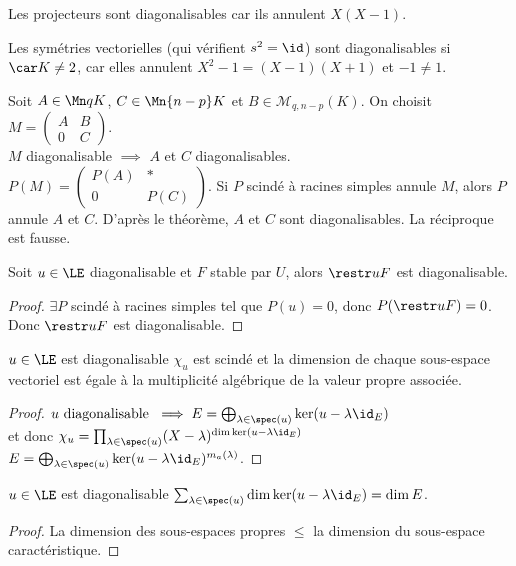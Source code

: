 \begin{exemple}
	Les projecteurs sont diagonalisables car ils annulent $X(X-1)$.

	Les symétries vectorielles (qui vérifient $s^2 = \id$) sont diagonalisables
	si $\car K \neq 2$, car elles annulent $X^2 - 1 = (X-1)(X+1)$ et $-1 \neq 1$.
\end{exemple}


\begin{exemple}
	Soit $A \in \Mn q K$, $C \in \Mn {n-p} K$ et $B \in \mathcal{M}_{q, n-p}(K)$.
	On choisit $M = \begin{pmatrix} A & B \\ 0 & C \end{pmatrix}$.\\
	$M$ diagonalisable $\implies$ $A$ et $C$ diagonalisables.\\
	$P(M) = \begin{pmatrix} P(A) & * \\ 0 & P(C) \end{pmatrix}$. Si $P$ scindé à racines simples annule $M$, alors $P$ annule $A$ et $C$.
	D'après le théorème, $A$ et $C$ sont diagonalisables.
	La réciproque est fausse.
\end{exemple}


\begin{prop}
	Soit $u \in \LE$ diagonalisable et $F$ stable par $U$, alors $\restr u F $ est diagonalisable.
\end{prop}

\begin{proof}
	$\exists P$ scindé à racines simples tel que $P(u) = 0$, donc $P(\restr u F) = 0$. Donc $\restr u F$ est diagonalisable.
\end{proof}


\begin{theorem}
	$u \in \LE$ est diagonalisable \ssi $\chi_u$ est scindé et la dimension de chaque sous-espace vectoriel est égale à la multiplicité
	algébrique de la valeur propre associée.
\end{theorem}

\begin{proof}
	$u \text{ diagonalisable } \implies E = \bigoplus_{\lambda \in \spec(u)} \ker(u - \lambda \id_E)$\\
	et donc $\chi_u = \prod_{\lambda \in \spec(u)} (X - \lambda)^{\dim \ker(u - \lambda \id_E)}$\\
	$E = \bigoplus_{\lambda \in \spec(u)} \ker(u - \lambda \id_E)^{m_a(\lambda)}$.

\end{proof}


\begin{coro}
	$u \in \LE$ est diagonalisable \ssi $\sum_{\lambda \in \spec(u)} \dim \ker(u - \lambda \id_E) = \dim E$.
\end{coro}

\begin{proof}
	La dimension des sous-espaces propres $\leq$ la dimension du sous-espace caractéristique. %
\end{proof}
